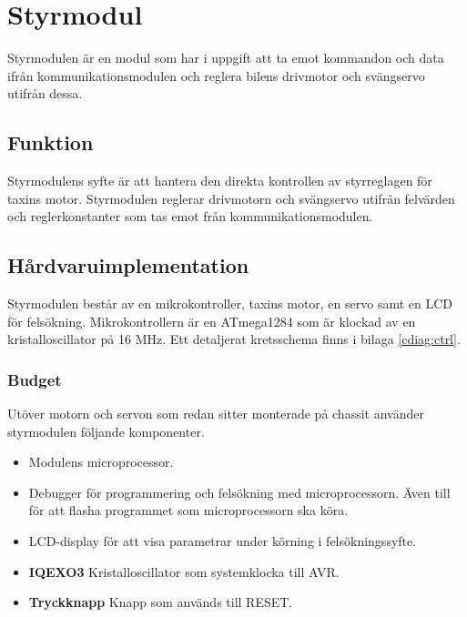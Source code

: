 \documentclass[tekniskrapport/tech.tex]{subfiles}
\begin{document}
\section{Styrmodul}
Styrmodulen är en modul som har i uppgift att ta emot kommandon och data ifrån
kommunikationsmodulen och reglera bilens drivmotor och svängservo utifrån
dessa.

\subsection{Funktion}
Styrmodulens syfte är att hantera den direkta kontrollen av styrreglagen för
taxins motor. Styrmodulen reglerar drivmotorn och svängservo utifrån
felvärden och reglerkonstanter som tas emot från kommunikationsmodulen.

\subsection{Hårdvaruimplementation}
Styrmodulen består av en mikrokontroller, taxins motor, en servo samt en LCD
för felsökning. Mikrokontrollern är en ATmega1284 som är klockad av en
kristalloscillator på 16 MHz. Ett detaljerat kretsschema finns i bilaga
\ref{cdiag:ctrl}.

\subsubsection{Budget}
Utöver motorn och servon som redan sitter monterade på chassit använder
styrmodulen följande komponenter.
\begin{itemize}
	\item \textbf{\modMicrocontroller} Modulens microprocessor. 
    \item \textbf{\modJtag} Debugger för programmering och felsökning med
        microprocessorn. Även till för att flasha programmet som
        microprocessorn ska köra.
    \item \textbf{\modLcd} LCD-display för att visa parametrar under körning i
        felsökningssyfte.
    \item \textbf{IQEXO3} Kristalloscillator som systemklocka till AVR.
    \item \textbf{Tryckknapp} Knapp som används till RESET.
\end{itemize}
\end{document}

